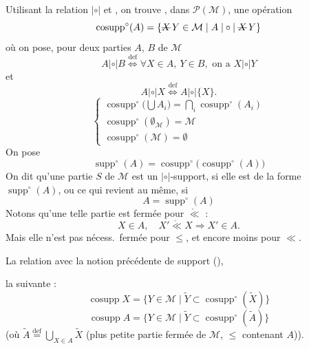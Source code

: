 \documentclass[11pt,a4paper]{article}
\begin{document}
Utilisant la relation $|\circ|$  et , on trouve \struck{\ill{}} , dans $\mathcal{P}(\mathcal{M})$, \struck{\ill{}} une opération
\[
  \operatorname{cosupp}^{\circ}(A) = \{ \text{\struck{$X$}}\, Y \in \mathcal{M} \mid A \mathrel{|\circ|} \text{\struck{$X$}}\, Y \}
\]
 où on pose, pour deux parties $A$, $B$ de $\mathcal{M}$
\[
  A \mathrel{|\circ|} B \overset{\mathrm{def}}{\Longleftrightarrow} \forall X \in A,\ Y \in B, \text{ on a } X \mathrel{|\circ|} Y
\]
et
\[
  A \mathrel{|\circ|} X \overset{\mathrm{def}}{\Longleftrightarrow} A \mathrel{|\circ|} \{ X \}.
\]
  
\[
  \begin{cases}
    \operatorname{cosupp}^{\circ}\bigl(\bigcup A_i\bigr) = \bigcap_i \operatorname{cosupp}^{\circ}(A_i) \\
    \operatorname{cosupp}^{\circ}(\emptyset_{\mathcal{M}}) = \mathcal{M} \\
    \operatorname{cosupp}^{\circ}(\mathcal{M}) = \emptyset
  \end{cases}
\]
On pose
\[
  \operatorname{supp}^{\circ}(A) = \operatorname{cosupp}^{\circ}\bigl(\operatorname{cosupp}^{\circ}(A)\bigr)
\]
On dit qu'une partie $S$  de $\mathcal{M}$ est un $|\circ|$-support, si elle est de la forme $\operatorname{supp}^{\circ}(A)$, ou ce qui revient au même, si
\[
  A = \operatorname{supp}^{\circ}(A)
\]
Notons qu'une telle partie est fermée pour $\mathrel{\mathring{\ll}}$ :
\[
  X \in A, \quad X' \mathrel{\mathring{\ll}} X \Longrightarrow X' \in A.
\]
Mais elle n'est pas nécess.\ fermée pour $\leq$, et encore moins pour $\ll$. \struck{\ill{}}

La relation avec la notion précédente de support (), 

la suivante :
\[
  \operatorname{cosupp} X = \{ Y \in \mathcal{M} \mid \widetilde{Y} \subset \operatorname{cosupp}^{\circ}(\widetilde{X}) \}
\]
\[
  \operatorname{cosupp} A = \{ Y \in \mathcal{M} \mid \widetilde{Y} \subset \operatorname{cosupp}^{\circ}(\widetilde{A}) \}
\]
(où $\widetilde{A} \overset{\mathrm{def}}{=} \bigcup_{X \in A} \widetilde{X}$ (plus petite partie fermée de $\mathcal{M}$, $\leq$ contenant $A$)).
\end{document}
